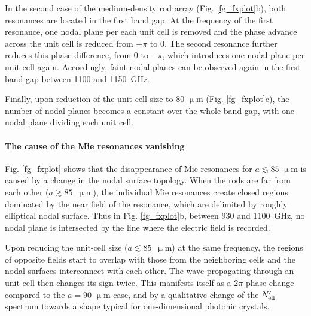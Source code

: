 In the second case of the medium-density rod array (Fig. \ref{fg_fxplot}b), both resonances are located in the first band gap. At the frequency of the first resonance, one nodal plane per each unit cell is removed and the phase advance across the unit cell is reduced from $+\pi$ to $0$. The second resonance further reduces this phase difference, from $0$ to $-\pi$, which introduces one nodal plane per unit cell again. Accordingly, faint nodal planes can be observed again in the first band gap between 1100 and 1150~GHz. 

Finally, upon reduction of the unit cell size to $80$ $\upmu$m (Fig. \ref{fg_fxplot}c), the number of nodal planes becomes a constant over the whole band gap, with one nodal plane dividing each unit cell. 

\paragraph{The cause of the Mie resonances vanishing}%
Fig. \ref{fg_fxplot} shows that the  disappearance of Mie resonances for $a\lesssim 85$ $\upmu$m is caused by a change in the nodal surface topology. When the rods are far from each other ($a\gtrsim 85$~$\upmu$m), the individual Mie resonances create closed regions dominated by the near field of the resonance, which are delimited by roughly elliptical nodal surface. Thus in Fig.  \ref{fg_fxplot}b, between 930 and 1100~GHz,  %
no nodal plane is intersected by the line where the electric field is recorded.

Upon reducing the unit-cell size ($a\lesssim 85$~$\upmu$m) at the same frequency, the regions of opposite fields start to overlap with those from the neighboring cells and the nodal surfaces interconnect with each other. The wave propagating through an unit cell then changes its sign twice. This manifests itself as a $2\pi$ phase change compared to the $a=90$ $\upmu$m case, and by a qualitative change of the $N_{\text{eff} }'$ spectrum towards a shape typical for one-dimensional photonic crystals.


